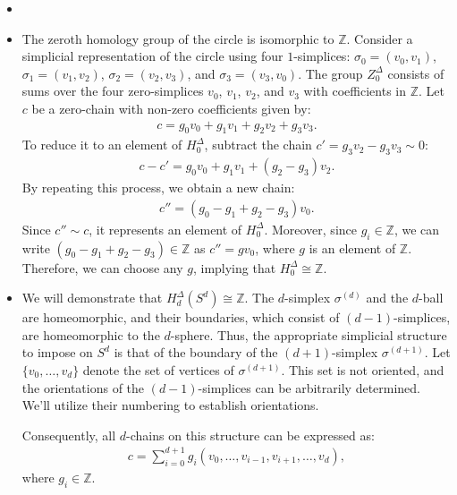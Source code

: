 \begin{example}
\begin{itemize}
\item[]

\item The zeroth homology group of the circle is isomorphic to \(\mathbb{Z}\).
Consider a simplicial representation of the circle using four \(1\)-simplices:
\(\sigma_{0} = (v_{0}, v_{1})\), \(\sigma_{1} = (v_{1}, v_{2})\), \(\sigma_{2} = (v_{2}, v_{3})\), and \(\sigma_{3} = (v_{3}, v_{0})\).
The group \(Z^{\Delta}_{0}\) consists of sums over the four zero-simplices \(v_{0}\),
\(v_{1}\), \(v_{2}\), and \(v_{3}\) with coefficients in \(\mathbb{Z}\). Let \(c\) be a zero-chain
with non-zero coefficients given by:
\begin{align}
c = g_{0} v_{0} + g_{1} v_{1} + g_{2} v_{2} + g_{3} v_{3}.
\end{align}
To reduce it to an element of \(H^{\Delta}_{0}\), subtract the chain \(c' = g_{3} v_{2} - g_{3} v_{3} \sim 0\):
\begin{align}
c - c' = g_{0} v_{0} + g_{1} v_{1} + (g_{2} - g_{3}) v_{2}.
\end{align}
By repeating this process, we obtain a new chain:
\begin{align}
c'' = (g_{0} - g_{1} + g_{2} - g_{3}) v_{0}.
\end{align}
Since \(c'' \sim c\), it represents an element of \(H^{\Delta}_{0}\). Moreover,
since \(g_{i} \in \mathbb{Z}\), we can write
\((g_{0} - g_{1} + g_{2} - g_{3}) \in \mathbb{Z}\) as \(c'' = g v_{0}\), where \(g\)
is an element of \(\mathbb{Z}\). Therefore, we can choose any \(g\), implying
that \(H^{\Delta}_{0} \cong \mathbb{Z}\).

\item We will demonstrate that \(H^{\Delta}_{d}(S^{d}) \cong \mathbb{Z}\). The
\(d\)-simplex \(\sigma^{(d)}\) and the \(d\)-ball are homeomorphic, and their boundaries,
which consist of \((d-1)\)-simplices, are homeomorphic to the \(d\)-sphere.
Thus, the appropriate simplicial structure to impose on \(S^{d}\) is that of
the boundary of the \((d+1)\)-simplex \(\sigma^{(d+1)}\). Let
\(\{v_{0}, \ldots, v_{d}\}\) denote the set of vertices of
\(\sigma^{(d+1)}\). This set is not oriented, and the orientations of the
\((d-1)\)-simplices can be arbitrarily determined. We'll utilize their numbering
to establish orientations.

Consequently, all \(d\)-chains on this structure can be expressed as:
\begin{align}
\label{chain}
c = \sum_{i=0}^{d+1}g_{i} (v_{0}, \ldots, v_{i-1}, v_{i+1}, \ldots, v_{d}),
\end{align}
where \(g_{i} \in \mathbb{Z}\).


\end{itemize}
\end{example}
